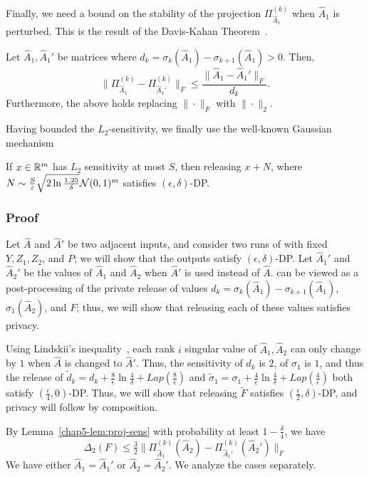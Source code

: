 Finally, we need a bound on the stability of the projection $\Pi_{\hat{A}_1}^{(k)}$ when $\hat{A}_1$ is perturbed. This is the result of the Davis-Kahan Theorem~\citep{bhatia1997}.
\begin{thm}\label{chap5-thm:davis-kahan}
Let $\hat{A}_1, \hat{A}_1'$ be matrices where $d_k= \sigma_k(\hat{A}_1) - \sigma_{k+1}(\hat{A}_1) > 0$. Then, 
\[
    \|\Pi_{\hat{A}_1}^{(k)} - \Pi_{\hat{A}_1'}^{(k)}\|_F \leq \frac{\|\hat{A}_1 - \hat{A}_1'\|_F}{d_k}.
\]
Furthermore, the above holds replacing $\|\cdot\|_F$ with $\|\cdot \|_2$.
\end{thm}

Having bounded the $L_2$-sensitivity, we finally use the well-known Gaussian mechanism~\citep{dwork2014algorithmic}
\begin{thm}\label{chap5-thm:gauss-mech}
    If $x \in \mathbb{R}^m$ has $L_2$ sensitivity at most $S$, then releasing $x + N$, where $N \sim \frac{S}{\varepsilon} \sqrt{2 \ln \frac{1.25}{\delta}}\mathcal{N}(0,1)^{m}$ satisfies $(\epsilon, \delta)$-DP.
\end{thm}

\subsubsection{Proof}
Let $\hat{A}$ and $\hat{A}'$ be two adjacent inputs, and consider two runs of \dpcom{} with fixed $Y,Z_1,Z_2$, and $P$; we will show that the outputs satisfy $(\epsilon, \delta)$-DP. Let $\hat{A}_1'$ and $\hat{A}_2'$ be the values of $\hat{A}_1$ and $\hat{A}_2$ when $\hat{A}'$ is used instead of $\hat{A}$. \dpcom{} can be viewed as a post-processing of the private release of values $d_k = \sigma_k(\hat{A}_1) - \sigma_{k+1}(\hat{A}_1)$, $\sigma_1(\hat{A}_2)$, and $F$; thus, we will show that releasing each of these values satisfies privacy.

Using Lindskii's inequality~\citep{bhatia1997}, each rank $i$ singular value of $\hat{A}_1, \hat{A}_2$ can only change by $1$ when $\hat{A}$ is changed to $\hat{A}'$. Thus, the sensitivity of $d_k$ is $2$, of $\sigma_1$ is $1$, and thus the release of $\tilde{d}_k = d_k + \frac{8}{\epsilon} \ln \frac{4}{\delta} + Lap(\frac{8}{\epsilon})$ and $\tilde{\sigma}_1 = \sigma_1 + \frac{4}{\epsilon} \ln \frac{4}{\delta} + Lap(\frac{4}{\epsilon})$ both satisfy $(\frac{\epsilon}{4}, 0)$-DP. Thus, we will show that releasing $\tilde{F}$ satisfies $(\frac \epsilon 2, \delta)$-DP, and privacy will follow by composition.

By Lemma~\ref{chap5-lem:proj-sens} with probability at least $1-\frac{\delta}{4}$, we have
\[
    \Delta_2(F) \leq \tfrac 3 2 \|\Pi_{\hat{A}_1}^{(k)}(\hat{A}_2) - \Pi_{\hat{A}_1'}^{(k)}(\hat{A}_2')\|_F
\]
We have either $\hat{A}_1 = \hat{A}_1'$ or $\hat{A}_2 = \hat{A}_2'$. We analyze the cases separately.

